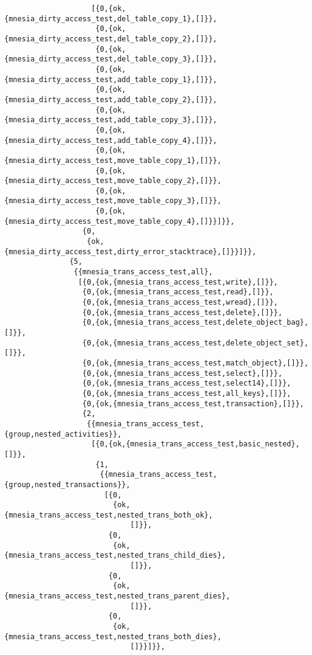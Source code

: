 \begin{verbatim}
                    [{0,{ok,{mnesia_dirty_access_test,del_table_copy_1},[]}},
                     {0,{ok,{mnesia_dirty_access_test,del_table_copy_2},[]}},
                     {0,{ok,{mnesia_dirty_access_test,del_table_copy_3},[]}},
                     {0,{ok,{mnesia_dirty_access_test,add_table_copy_1},[]}},
                     {0,{ok,{mnesia_dirty_access_test,add_table_copy_2},[]}},
                     {0,{ok,{mnesia_dirty_access_test,add_table_copy_3},[]}},
                     {0,{ok,{mnesia_dirty_access_test,add_table_copy_4},[]}},
                     {0,{ok,{mnesia_dirty_access_test,move_table_copy_1},[]}},
                     {0,{ok,{mnesia_dirty_access_test,move_table_copy_2},[]}},
                     {0,{ok,{mnesia_dirty_access_test,move_table_copy_3},[]}},
                     {0,{ok,{mnesia_dirty_access_test,move_table_copy_4},[]}}]}},
                  {0,
                   {ok,{mnesia_dirty_access_test,dirty_error_stacktrace},[]}}]}},
               {5,
                {{mnesia_trans_access_test,all},
                 [{0,{ok,{mnesia_trans_access_test,write},[]}},
                  {0,{ok,{mnesia_trans_access_test,read},[]}},
                  {0,{ok,{mnesia_trans_access_test,wread},[]}},
                  {0,{ok,{mnesia_trans_access_test,delete},[]}},
                  {0,{ok,{mnesia_trans_access_test,delete_object_bag},[]}},
                  {0,{ok,{mnesia_trans_access_test,delete_object_set},[]}},
                  {0,{ok,{mnesia_trans_access_test,match_object},[]}},
                  {0,{ok,{mnesia_trans_access_test,select},[]}},
                  {0,{ok,{mnesia_trans_access_test,select14},[]}},
                  {0,{ok,{mnesia_trans_access_test,all_keys},[]}},
                  {0,{ok,{mnesia_trans_access_test,transaction},[]}},
                  {2,
                   {{mnesia_trans_access_test,{group,nested_activities}},
                    [{0,{ok,{mnesia_trans_access_test,basic_nested},[]}},
                     {1,
                      {{mnesia_trans_access_test,{group,nested_transactions}},
                       [{0,
                         {ok,{mnesia_trans_access_test,nested_trans_both_ok},
                             []}},
                        {0,
                         {ok,{mnesia_trans_access_test,nested_trans_child_dies},
                             []}},
                        {0,
                         {ok,{mnesia_trans_access_test,nested_trans_parent_dies},
                             []}},
                        {0,
                         {ok,{mnesia_trans_access_test,nested_trans_both_dies},
                             []}}]}},

\end{verbatim}

